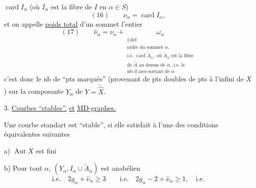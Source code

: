 $\operatorname{card}I_\alpha$ (où $I_\alpha$ est la fibre de $I$ en $\alpha\in S$)
\[
(16)\qquad\nu_\alpha=\operatorname{card}I_\alpha,
\]
et on appelle \uline{poids total} d'un sommet l'entier
\[
(17)\qquad\widehat\nu_\alpha=\nu_\alpha+
\underset{\substack{\Vert\ \mathrm{déf}\\
\text{ordre du sommet }\alpha,\\
\text{i.e. }\operatorname{card}\widetilde A_\alpha,\text{ où }\widetilde A_\alpha\text{ est la fibre}\\
\text{de }\widetilde A\text{ au dessus de }\alpha,\text{ i.e. le}\\
\text{nb d'arcs sortant de }\alpha}}{\omega_\alpha}
\]
c'est donc le nb de ``pts marqués'' (provenant de pts doubles  de pts à l'infini de $X$) sur la composante $Y_\alpha$ de $Y=\widetilde{\widehat X}$.

3. \uline{Courbes ``stables''.} \uline{et} \uline{MD-graphes.}

Une courbe standart  est ``stable'', si elle satisfait à l'une des conditions équivalentes suivantes

a) $\operatorname{Aut}X$ est fini

b) Pour tout $\alpha$, $(Y_\alpha,I_\alpha\cup\widetilde A_\alpha)$ est anabélien
\[
\text{i.e.}\quad 2g_\alpha+\widehat\nu_\alpha\geq3\qquad
\text{i.e.}\quad 2g_\alpha-2+\widehat\nu_\alpha\geq1,\quad\text{i.e.}
\]
